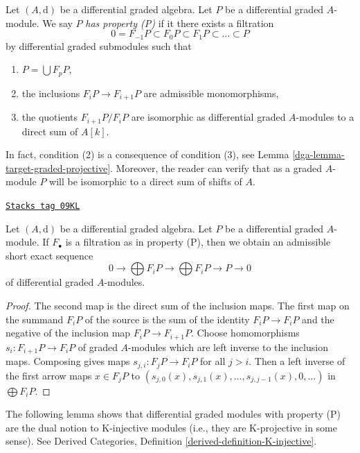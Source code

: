 \medskip\noindent
Let $(A, \text{d})$ be a differential graded algebra.
Let $P$ be a differential graded $A$-module. We say $P$
{\it has property (P)} if it there exists a filtration
$$
0 = F_{-1}P \subset F_0P \subset F_1P \subset \ldots \subset P
$$
by differential graded submodules such that
\begin{enumerate}
\item $P = \bigcup F_pP$,
\item the inclusions $F_iP \to F_{i + 1}P$ are admissible
monomorphisms,
\item the quotients $F_{i + 1}P/F_iP$ are isomorphic as differential
graded $A$-modules to a direct sum of $A[k]$.
\end{enumerate}
In fact, condition (2) is a consequence of condition (3), see
Lemma \ref{dga-lemma-target-graded-projective}. Moreover, the reader
can verify that as a graded $A$-module $P$ will be isomorphic to a
direct sum of shifts of $A$.

\begin{lemma}
\label{dga-lemma-property-P-sequence}
\href{https://stacks.math.columbia.edu/tag/09KL}{\texttt{Stacks tag 09KL}}

Let $(A, \text{d})$ be a differential graded algebra.
Let $P$ be a differential graded $A$-module. If $F_\bullet$
is a filtration as in property (P), then we obtain an
admissible short exact sequence
$$
0 \to
\bigoplus\nolimits F_iP \to
\bigoplus\nolimits F_iP \to P \to 0
$$
of differential graded $A$-modules.
\end{lemma}

\begin{proof}
The second map is the direct sum of the inclusion maps.
The first map on the summand $F_iP$ of the source is the sum
of the identity $F_iP \to F_iP$ and the negative of the inclusion
map $F_iP \to F_{i + 1}P$. Choose homomorphisms $s_i : F_{i + 1}P \to F_iP$
of graded $A$-modules which are left inverse to the inclusion maps.
Composing gives maps $s_{j, i} : F_jP \to F_iP$ for all $j > i$.
Then a left inverse of the first arrow maps $x \in F_jP$ to
$(s_{j, 0}(x), s_{j, 1}(x), \ldots, s_{j, j - 1}(x), 0, \ldots)$
in $\bigoplus F_iP$.
\end{proof}

The following lemma shows that differential graded modules with
property (P) are the dual notion to K-injective modules
(i.e., they are K-projective in some sense). See
Derived Categories, Definition \ref{derived-definition-K-injective}.

